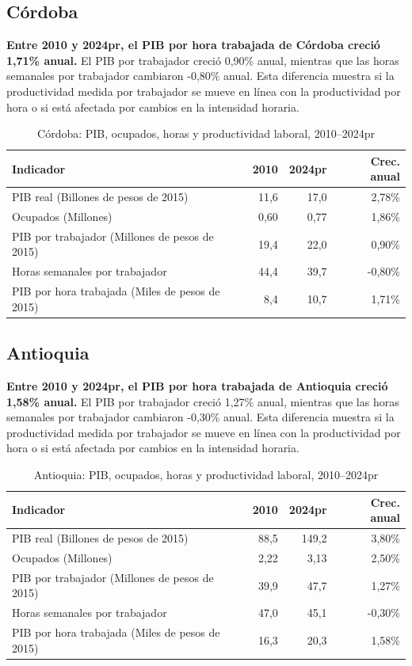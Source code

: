 \subsection{Córdoba}
\textbf{Entre 2010 y 2024pr, el PIB por hora trabajada de Córdoba creció 1,71\% anual.} El PIB por trabajador creció 0,90\% anual, mientras que las horas semanales por trabajador cambiaron -0,80\% anual. Esta diferencia muestra si la productividad medida por trabajador se mueve en línea con la productividad por hora o si está afectada por cambios en la intensidad horaria.
\begin{table}[H]
\centering
\caption{Córdoba: PIB, ocupados, horas y productividad laboral, 2010--2024pr}
\label{tab:departamento_cordoba_productividad}
\scriptsize
\begin{tabular}{lrrr}
\toprule
Indicador & 2010 & 2024pr & Crec. anual \\
\midrule
PIB real (Billones de pesos de 2015) & 11,6 & 17,0 & 2,78\% \\
Ocupados (Millones) & 0,60 & 0,77 & 1,86\% \\
PIB por trabajador (Millones de pesos de 2015) & 19,4 & 22,0 & 0,90\% \\
Horas semanales por trabajador & 44,4 & 39,7 & -0,80\% \\
PIB por hora trabajada (Miles de pesos de 2015) & 8,4 & 10,7 & 1,71\% \\
\bottomrule
\end{tabular}
\end{table}

\subsection{Antioquia}
\textbf{Entre 2010 y 2024pr, el PIB por hora trabajada de Antioquia creció 1,58\% anual.} El PIB por trabajador creció 1,27\% anual, mientras que las horas semanales por trabajador cambiaron -0,30\% anual. Esta diferencia muestra si la productividad medida por trabajador se mueve en línea con la productividad por hora o si está afectada por cambios en la intensidad horaria.
\begin{table}[H]
\centering
\caption{Antioquia: PIB, ocupados, horas y productividad laboral, 2010--2024pr}
\label{tab:departamento_antioquia_productividad}
\scriptsize
\begin{tabular}{lrrr}
\toprule
Indicador & 2010 & 2024pr & Crec. anual \\
\midrule
PIB real (Billones de pesos de 2015) & 88,5 & 149,2 & 3,80\% \\
Ocupados (Millones) & 2,22 & 3,13 & 2,50\% \\
PIB por trabajador (Millones de pesos de 2015) & 39,9 & 47,7 & 1,27\% \\
Horas semanales por trabajador & 47,0 & 45,1 & -0,30\% \\
PIB por hora trabajada (Miles de pesos de 2015) & 16,3 & 20,3 & 1,58\% \\
\bottomrule
\end{tabular}
\end{table}

